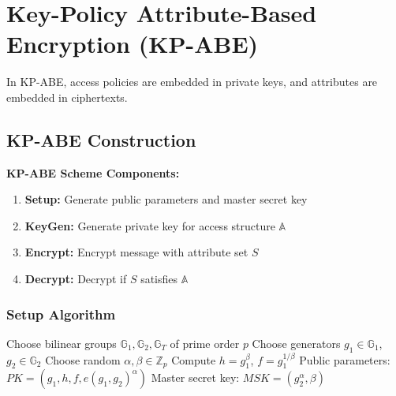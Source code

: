 \documentclass[11pt,a4paper]{article}
\begin{document}
\section{Key-Policy Attribute-Based Encryption (KP-ABE)}

In KP-ABE, access policies are embedded in private keys, and attributes are embedded in ciphertexts.

\subsection{KP-ABE Construction}

\begin{mathbox}
\textbf{KP-ABE Scheme Components:}
\begin{enumerate}
    \item \textbf{Setup:} Generate public parameters and master secret key
    \item \textbf{KeyGen:} Generate private key for access structure $\mathbb{A}$
    \item \textbf{Encrypt:} Encrypt message with attribute set $S$
    \item \textbf{Decrypt:} Decrypt if $S$ satisfies $\mathbb{A}$
\end{enumerate}
\end{mathbox}

\subsubsection{Setup Algorithm}

\begin{algorithm}
\caption{KP-ABE Setup}
\begin{algorithmic}
\STATE Choose bilinear groups $\mathbb{G}_1, \mathbb{G}_2, \mathbb{G}_T$ of prime order $p$
\STATE Choose generators $g_1 \in \mathbb{G}_1$, $g_2 \in \mathbb{G}_2$
\STATE Choose random $\alpha, \beta \in \mathbb{Z}_p$
\STATE Compute $h = g_1^\beta$, $f = g_1^{1/\beta}$
\STATE Public parameters: $PK = (g_1, h, f, e(g_1, g_2)^\alpha)$
\STATE Master secret key: $MSK = (g_2^\alpha, \beta)$
\end{algorithmic}
\end{algorithm}
\end{document}
